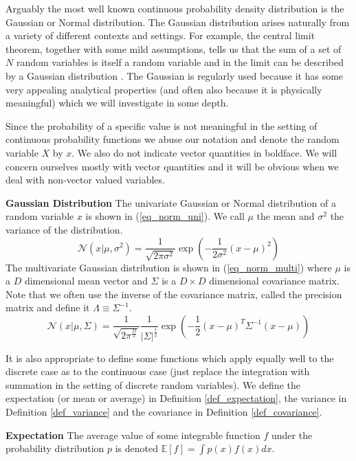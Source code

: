 \documentclass[../masters.tex]{subfiles}
\begin{document}
Arguably the most well known continuous probability density distribution is the Gaussian or Normal distribution. The Gaussian distribution arises naturally from a variety of different contexts and settings. For example, the central limit theorem, together with some mild assumptions, tells us that the sum of a set of $N$ random  variables is itself a random variable and in the limit can be described by a Gaussian distribution \cite{bishop}. The Gaussian is regularly used because it has some very appealing analytical properties (and often also because it is physically meaningful) which we will investigate in some depth. 

Since the probability of a specific value is not meaningful in the setting of continuous probability functions we abuse our notation and denote the random variable $X$ by $x$. We also do not indicate vector quantities in boldface. We will concern ourselves mostly with vector quantities and it will be obvious when we deal with non-vector valued variables. 
\begin{defn}
\textbf{Gaussian Distribution} The univariate Gaussian or Normal distribution of a random variable $x$ is shown in (\ref{eq_norm_uni}). We call $\mu$ the mean and $\sigma^2$ the variance of the distribution.
\begin{equation}
\mathcal{N}(x|\mu, \sigma^2) = \frac{1}{\sqrt{2\pi\sigma^2}}\exp\left(-\frac{1}{2\sigma^2}(x-\mu)^2\right)
\label{eq_norm_uni}
\end{equation}
The multivariate Gaussian distribution is shown in (\ref{eq_norm_multi}) where $\mu$ is a $D$ dimensional mean vector and $\Sigma$ is a $D \times D$ dimensional covariance matrix. Note that we often use the inverse of the covariance matrix, called the precision matrix and define it $\Lambda \equiv \Sigma^{-1}$.
\begin{equation}
\mathcal{N}(x|\mu, \Sigma) = \frac{1}{\sqrt{2\pi^{\frac{D}{2}}}}\frac{1}{|\Sigma|^{\frac{1}{2}}}\exp\left(-\frac{1}{2}(x-\mu)^T\Sigma^{-1}(x-\mu)\right)
\label{eq_norm_multi}
\end{equation}
\label{defn_gauss}
\end{defn}
It is also appropriate to define some functions which apply equally well to the discrete case as to the continuous case (just replace the integration with summation in the setting of discrete random variables). We define the expectation (or mean or average) in Definition \ref{def_expectation}, the variance in Definition \ref{def_variance} and the covariance in Definition \ref{def_covariance}. 
\begin{defn}
\textbf{Expectation} The average value of some integrable function $f$ under the probability distribution $p$ is denoted $\mathbb{E}[f] = \int p(x)f(x)dx$.
\label{def_expectation}
\end{defn}
\end{document}
